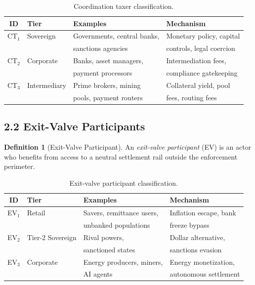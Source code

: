 \documentclass[12pt]{article}
\theoremstyle{definition}
\newtheorem{definition}{Definition}
\theoremstyle{remark}
\begin{document}
\begin{table}[h]
\centering
\begin{tabular}{@{}clll@{}}
\toprule
ID & Tier & Examples & Mechanism \\
\midrule
CT$_1$ & Sovereign & Governments, central banks, & Monetary policy, capital \\
       &           & sanctions agencies           & controls, legal coercion \\[3pt]
CT$_2$ & Corporate & Banks, asset managers,       & Intermediation fees, \\
       &           & payment processors           & compliance gatekeeping \\[3pt]
CT$_3$ & Intermediary & Prime brokers, mining     & Collateral yield, pool \\
       &              & pools, payment routers    & fees, routing fees \\
\bottomrule
\end{tabular}
\caption{Coordination taxer classification.}
\label{tab:ct}
\end{table}

\subsection{2.2 Exit-Valve Participants}

\begin{definition}[Exit-Valve Participant]\label{def:ev}
An \emph{exit-valve participant} (EV) is an actor who benefits from
access to a neutral settlement rail outside the enforcement perimeter.
\end{definition}

\begin{table}[h]
\centering
\begin{tabular}{@{}clll@{}}
\toprule
ID & Tier & Examples & Mechanism \\
\midrule
EV$_1$ & Retail & Savers, remittance users, & Inflation escape, bank \\
       &        & unbanked populations      & freeze bypass \\[3pt]
EV$_2$ & Tier-2 Sovereign & Rival powers, & Dollar alternative, \\
       &                  & sanctioned states & sanctions evasion \\[3pt]
EV$_3$ & Corporate & Energy producers, miners, & Energy monetization, \\
       &           & AI agents                & autonomous settlement \\
\bottomrule
\end{tabular}
\caption{Exit-valve participant classification.}
\label{tab:ev}
\end{table}
\end{document}
